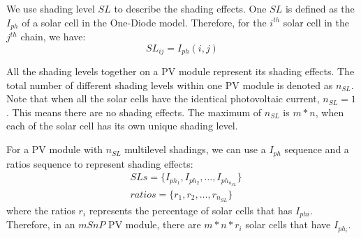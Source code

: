 We use shading level $SL$ to describe the shading effects. One $SL$ is defined as the $I_{ph}$ of a solar cell in the One-Diode model. Therefore, for the $i^{th}$ solar cell in the $j^{th}$ chain, we have:
\begin{equation}\label{equ:shadingLevel}
  SL_{ij} = I_{ph}(i,j)
\end{equation}

All the shading levels together on a PV module represent its shading effects. The total number of different shading levels within one PV module is denoted as $n_{SL}$. Note that when all the solar cells have the identical photovoltaic current, $n_{SL} = 1$. This means there are no shading effects. The maximum of $n_{SL}$ is $m*n$, when each of the solar cell has its own unique shading level.

For a PV module with $n_{SL}$ multilevel shadings, we can use a $I_{ph}$ sequence and a ratios sequence to represent shading effects:
\begin{equation}\label{equ:slRepresent}
\begin{aligned}
  &SLs = \{I_{ph_1}, I_{ph_2},\dots, I_{ph_{n_{SL}}}\}\\
  &ratios = \{r_1, r_2, \dots, r_{n_{SL}}\}
\end{aligned}
\end{equation}
where the ratios $r_i$ represents the percentage of solar cells that has $I_{phi}$. Therefore, in an $mSnP$ PV module, there are $m*n*r_i$ solar cells that have $I_{ph_i}$.




